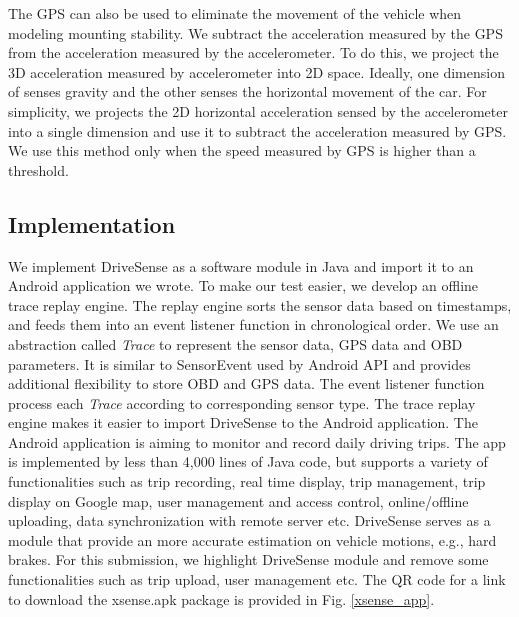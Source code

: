 The GPS can also be used to eliminate the movement of the vehicle
when modeling mounting stability. 
We subtract the acceleration measured by the GPS from
the acceleration measured by the accelerometer. 
To do this, we project the 3D acceleration measured
by accelerometer into 2D space. 
Ideally, one dimension of senses gravity and the other
senses the horizontal movement of the car. 
For simplicity, we projects the 2D horizontal 
acceleration sensed by the accelerometer
into a single dimension and use it to subtract the acceleration
measured by GPS. 
We use this method only when the speed measured by GPS
is higher than a threshold. 


\subsection{Implementation}


We implement DriveSense as a software module in Java and 
import it to an Android application we wrote.
To make our test easier, we develop an offline 
trace replay engine.
The replay engine sorts the sensor data
based on timestamps, and feeds them into an event listener function in chronological order. 
We use an abstraction called \emph{Trace} to represent the sensor data, 
GPS data and OBD parameters.
It is similar to SensorEvent used by Android API \cite{sensor}
and provides additional flexibility to store OBD and GPS data. 
The event listener function process each \emph{Trace} 
according to corresponding sensor type.  
The trace replay engine makes it easier to import
DriveSense to the Android application. 
The Android application is aiming to monitor and record
daily driving trips. 
The app is implemented by less than 4,000 lines of Java code, 
but supports a variety of functionalities such as
trip recording, real time display, trip management,
trip display on Google map, user management and access control, 
online/offline uploading, data synchronization with remote server etc. 
DriveSense serves as a module that provide an more accurate
estimation on vehicle motions, e.g., hard brakes. 
For this submission, we highlight DriveSense module 
and remove some functionalities such as
trip upload, user management etc.
The QR code for a link to download the xsense.apk package is provided in Fig. \ref{xsense_app}. 

